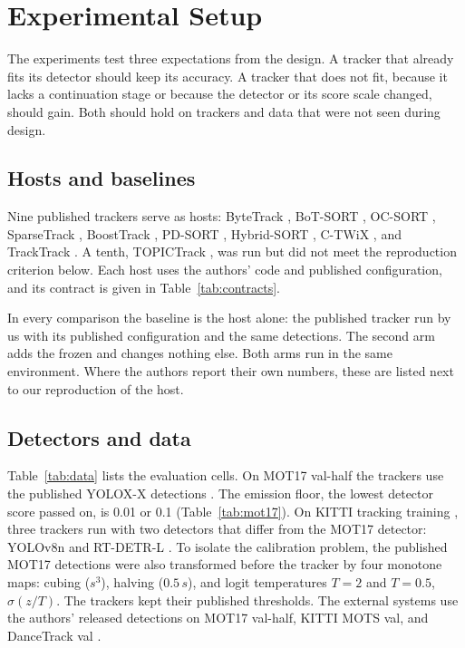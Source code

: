 \section{Experimental Setup}\label{sec:setup}

The experiments test three expectations from the design. A tracker that
already fits its detector should keep its accuracy. A tracker that does not
fit, because it lacks a continuation stage or because the detector or its
score scale changed, should gain. Both should hold on trackers and data that
were not seen during design.

\subsection{Hosts and baselines}\label{sec:hosts}
Nine published trackers serve as hosts: ByteTrack \cite{zhang2022bytetrack},
BoT-SORT \cite{aharon2022botsort}, OC-SORT \cite{cao2023ocsort}, SparseTrack
\cite{liu2025sparsetrack}, BoostTrack \cite{stanojevic2024boosttrack},
PD-SORT \cite{wang2025pdsort}, Hybrid-SORT \cite{yang2024hybridsort},
C-TWiX \cite{miah2025twix}, and TrackTrack \cite{shim2025tracktrack}. A tenth,
TOPICTrack \cite{cao2025topictrack}, was run but did not meet the reproduction
criterion below. Each host uses the authors' code and published configuration,
and its contract is given in Table~\ref{tab:contracts}.

In every comparison the baseline is the host alone: the published tracker run
by us with its published configuration and the same detections. The second
arm adds the frozen \scl{} and changes nothing else. Both arms run in the same
environment. Where the authors report their own numbers, these are listed
next to our reproduction of the host.

\subsection{Detectors and data}\label{sec:data}
Table~\ref{tab:data} lists the evaluation cells. On MOT17 val-half
\cite{milan2016mot16} the trackers use the published YOLOX-X detections
\cite{ge2021yolox}. The emission floor, the lowest detector score passed on,
is 0.01 or 0.1 (Table~\ref{tab:mot17}). On KITTI tracking training \cite{geiger2012kitti}, three trackers run
with two detectors that differ from the MOT17 detector: YOLOv8n
\cite{jocher2023yolov8} and RT-DETR-L \cite{zhao2024rtdetr}. To isolate the
calibration problem, the published MOT17 detections were also transformed
before the tracker by four monotone maps: cubing ($s^3$), halving ($0.5\,s$),
and logit temperatures $T=2$ and $T=0.5$, $\sigma(z/T)$. The trackers kept
their published thresholds. The external systems use the authors' released
detections on MOT17 val-half, KITTI MOTS val, and DanceTrack val
\cite{sun2022dancetrack}.

